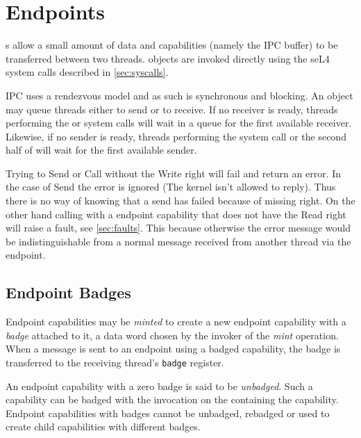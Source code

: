 \section{Endpoints}

s allow a small amount
of data and capabilities (namely the IPC buffer) to be transferred between two
threads.  objects are invoked directly using the seL4 system calls
described in \autoref{sec:syscalls}. 

IPC  uses a rendezvous model and as such is
synchronous and blocking. An  object  may queue
threads either to send or to receive. If no receiver is ready, threads
performing the  or 
system calls will wait in a queue for the first available receiver. Likewise, if
no sender is ready, threads performing the 
system call or the second half of 
will wait for the first available sender.

Trying to Send or Call without the Write right will fail and return an error. In
the case of Send the error is ignored (The kernel isn't allowed to reply). Thus
there is no way of knowing that a send has failed because of missing right.
On the other hand calling  with a endpoint capability that
does not have the Read right will raise a fault, see \autoref{sec:faults}. This
because otherwise the error message would be indistinguishable from a normal
message received from another thread via the endpoint.

\subsection{Endpoint Badges\label{s:ep-badge}}
\label{sec:ep-badges}

Endpoint capabilities may be \emph{minted} to
create a new endpoint capability with a \emph{badge} attached to it, a data
word chosen by the invoker of the \emph{mint} operation. When a message is sent to an endpoint using a badged
capability, the badge is transferred to the receiving thread's
\texttt{badge} register.

An endpoint capability with a zero badge is said to be \emph{unbadged}.
Such a capability can be badged with the 
invocation on the  containing the capability. Endpoint
capabilities with badges cannot be unbadged, rebadged or used to create
child capabilities with different badges.

